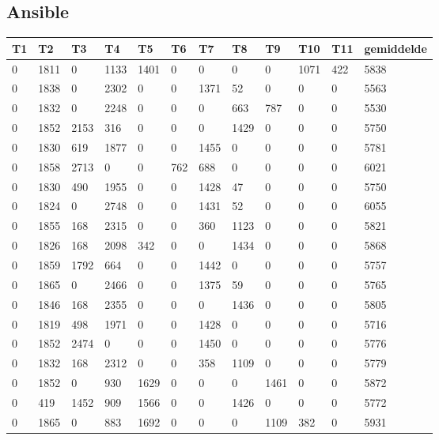 \subsection{Ansible}
\label{dataset:netwerkverkeer:ansible}
\begin{longtable}{ | l | l | l | l | l | l | l | l | l | l | l || l | }

	\hline
	T1 & T2 & T3 & T4 & T5 & T6 & T7 & T8 & T9 & T10 & T11 & gemiddelde  \\ \hline
	0 & 1811 & 0 & 1133 & 1401 & 0 & 0 & 0 & 0 & 1071 & 422 & 5838  \\ \hline
	0 & 1838 & 0 & 2302 & 0 & 0 & 1371 & 52 & 0 & 0 & 0 & 5563    \\ \hline
	0 & 1832 & 0 & 2248 & 0 & 0 & 0 & 663 & 787 & 0 & 0 & 5530 \\ \hline
	0 & 1852 & 2153 & 316 & 0 & 0 & 0 & 1429 & 0 & 0 & 0 & 5750  \\ \hline
	0 & 1830 & 619 & 1877 & 0 & 0 & 1455 & 0 & 0 & 0 & 0 & 5781  \\ \hline
	0 & 1858 & 2713 & 0 & 0 & 762 & 688 & 0 & 0 & 0 & 0 & 6021   \\ \hline
	0 & 1830 & 490 & 1955 & 0 & 0 & 1428 & 47 & 0 & 0 & 0 & 5750  \\ \hline
	0 & 1824 & 0 & 2748 & 0 & 0 & 1431 & 52 & 0 & 0 & 0 & 6055   \\ \hline
	0 & 1855 & 168 & 2315 & 0 & 0 & 360 & 1123 & 0 & 0 & 0 & 5821  \\ \hline
	0 & 1826 & 168 & 2098 & 342 & 0 & 0 & 1434 & 0 & 0 & 0 & 5868  \\ \hline
	0 & 1859 & 1792 & 664 & 0 & 0 & 1442 & 0 & 0 & 0 & 0 & 5757 \\ \hline
	0 & 1865 & 0 & 2466 & 0 & 0 & 1375 & 59 & 0 & 0 & 0 & 5765  \\ \hline
	0 & 1846 & 168 & 2355 & 0 & 0 & 0 & 1436 & 0 & 0 & 0 & 5805 \\ \hline
	0 & 1819 & 498 & 1971 & 0 & 0 & 1428 & 0 & 0 & 0 & 0 & 5716   \\ \hline
	0 & 1852 & 2474 & 0 & 0 & 0 & 1450 & 0 & 0 & 0 & 0 & 5776   \\ \hline
	0 & 1832 & 168 & 2312 & 0 & 0 & 358 & 1109 & 0 & 0 & 0 & 5779  \\ \hline
	0 & 1852 & 0 & 930 & 1629 & 0 & 0 & 0 & 1461 & 0 & 0 & 5872    \\ \hline
	0 & 419 & 1452 & 909 & 1566 & 0 & 0 & 1426 & 0 & 0 & 0 & 5772  \\ \hline
	0 & 1865 & 0 & 883 & 1692 & 0 & 0 & 0 & 1109 & 382 & 0 & 5931   \\ \hline

\end{longtable}
